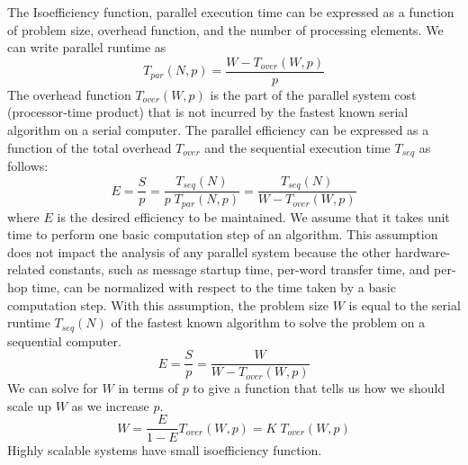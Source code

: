 \documentclass[a4paper, 11pt]{article}
\begin{document}
\begin{small}
The Isoefficiency function, parallel execution time can be expressed as a function of problem size, overhead function, and the number of processing elements. 
We can write parallel runtime as
\begin{equation*}
  T_{par}(N,p) = \frac{W-T_{over}(W,p)}{p}
\end{equation*}
The overhead function $T_{over}(W,p)$ is the part of the parallel system cost (processor‐time product) that is not incurred by the fastest known serial algorithm on a serial computer.
The parallel efficiency can be expressed as a function of the total overhead $T_{over}$ and the sequential execution time $T_{seq}$ as follows:
\begin{equation*}
E  = \frac{S}{p} = \frac{T_{seq}(N)}{p\;T_{par}(N,p)} = \frac{T_{seq}(N)}{W-T_{over}(W,p)}%
\end{equation*}
where $E$ is the desired efficiency to be maintained. 
We assume that it takes unit time to perform one basic computation step of an algorithm.
This assumption does not impact the analysis of any parallel system because the other hardware-related constants, such as message startup time,
per-word transfer time, and per-hop time, can be normalized with respect to the time taken by a basic computation step. 
With this assumption, the problem size $W$ is equal to the serial runtime $T_{seq}(N)$ of the fastest known algorithm to solve the problem on a sequential computer.
\begin{equation*}
E  = \frac{S}{p} = \frac{W}{W-T_{over}(W,p)}%
\end{equation*}
We can solve for $W$ in terms of $p$ to give a function that tells us how we should scale up $W$ as we increase $p$.
\begin{equation*}
W = \frac{E}{1-E} T_{over}(W,p) = K\;T_{over}(W,p)
\end{equation*}
Highly scalable systems have small isoefficiency function. 


\end{small}
\end{document}
